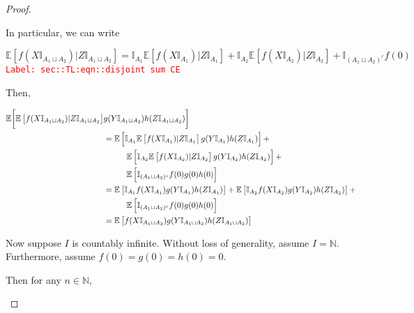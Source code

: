 \documentclass[12pt]{article}
\newcommand{\mb}{\mathbb}
\newcommand{\tr}{\textcolor{red}}
\newcommand{\labe}[1]{\tr{\texttt{Label: #1}}}
\newcommand{\ex}[1]{\mb{E}\left[#1\right]}			%
\newcommand{\X}{X}								%
\newcommand{\indx}[1]{_{#1}}					%
\newcommand{\XX}{Y}								%
\newcommand{\XXX}{Z}							%
\newcommand{\typset}{A}							%
\begin{document}
\begin{proof}
\begin{enumerate}[(a)]
In particular, we can write

\begin{equation}
\ex{f(\X\mb{I}_{\typset\indx{1}\sqcup \typset\indx{2}})|\XXX\mb{I}_{\typset\indx{1}\sqcup \typset\indx{2}}} = \mb{I}_{\typset\indx{1}}\ex{f(\X\mb{I}_{\typset\indx{1}})|\XXX\mb{I}_{\typset\indx{1}}} + \mb{I}_{\typset\indx{2}}\ex{f(\X\mb{I}_{\typset\indx{2}})|\XXX\mb{I}_{\typset\indx{2}}} + \mb{I}_{(\typset\indx{1}\sqcup \typset\indx{2})^c}f(0)
\label{sec::TL:eqn::disjoint sum CE}
\end{equation}
\labe{sec::TL:eqn::disjoint sum CE}

Then,

\begin{align*}
\mb{E}\bigg[\ex{f(\X\mb{I}_{\typset\indx{1}\sqcup \typset\indx{2}})|\XXX\mb{I}_{\typset\indx{1}\sqcup \typset\indx{2}}}&g(\XX\mb{I}_{\typset\indx{1}\sqcup \typset\indx{2}})h(\XXX\mb{I}_{\typset\indx{1}\sqcup \typset\indx{2}})\bigg]\\
&= \ex{\mb{I}_{\typset\indx{1}}\ex{f(\X\mb{I}_{\typset\indx{1}})|\XXX\mb{I}_{\typset\indx{1}}}g(\XX\mb{I}_{\typset\indx{1}})h(\XXX\mb{I}_{\typset\indx{1}})} +\\
&\hspace{1 cm} \ex{\mb{I}_{\typset\indx{2}}\ex{f(\X\mb{I}_{\typset\indx{2}})|\XXX\mb{I}_{\typset\indx{2}}}g(\XX\mb{I}_{\typset\indx{2}})h(\XXX\mb{I}_{\typset\indx{2}})} + \\
&\hspace{1 cm} \ex{\mb{I}_{(\typset\indx{1}\sqcup \typset\indx{2})^c}f(0)g(0)h(0)}\\
&= \ex{\mb{I}_{\typset\indx{1}}f(\X\mb{I}_{\typset\indx{1}})g(\XX\mb{I}_{\typset\indx{1}})h(\XXX\mb{I}_{\typset\indx{1}})} + \ex{\mb{I}_{\typset\indx{2}}f(\X\mb{I}_{\typset\indx{2}})g(\XX\mb{I}_{\typset\indx{2}})h(\XXX\mb{I}_{\typset\indx{2}})} +\\
&\hspace{1 cm} \ex{\mb{I}_{(\typset\indx{1}\sqcup \typset\indx{2})^c}f(0)g(0)h(0)}\\
&= \ex{f(\X\mb{I}_{\typset\indx{1}\sqcup \typset\indx{2}})g(\XX\mb{I}_{\typset\indx{1}\sqcup \typset\indx{2}})h(\XXX\mb{I}_{\typset\indx{1}\sqcup \typset\indx{2}})}
\end{align*}

Now suppose \(I\) is countably infinite. Without loss of generality, assume \(I = \mb{N}\). Furthermore, assume \(f(0) = g(0) = h(0) = 0\).

Then for any \(n \in \mb{N}\),


\end{enumerate}
\end{proof}
\end{document}
